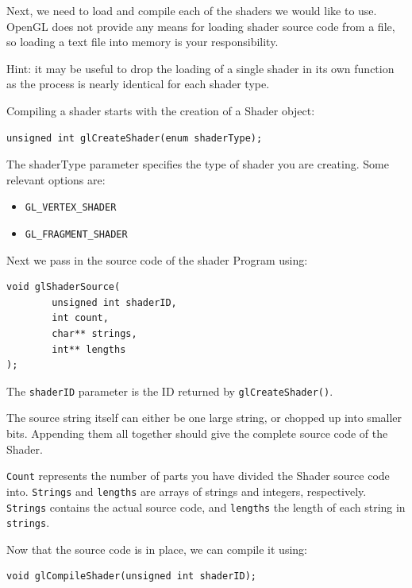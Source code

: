 Next, we need to load and compile each of the shaders we would like to use. OpenGL does not provide any means for loading shader source code from a file, so loading a text file into memory is your responsibility. 

Hint: it may be useful to drop the loading of a single shader in its own function as the process is nearly identical for each shader type.

Compiling a shader starts with the creation of a Shader object:

\begin{verbatim}
unsigned int glCreateShader(enum shaderType);
\end{verbatim}

The shaderType parameter specifies the type of shader you are creating. Some relevant options are:

\begin{itemize}
  \item \texttt{GL_VERTEX_SHADER}
  \item \texttt{GL_FRAGMENT_SHADER}
\end{itemize}

Next we pass in the source code of the shader Program using:

\begin{verbatim}
void glShaderSource(
        unsigned int shaderID, 
        int count, 
        char** strings, 
        int** lengths
);
\end{verbatim}

The \texttt{shaderID} parameter is the ID returned by \texttt{glCreateShader()}.

The source string itself can either be one large string, or chopped up into smaller bits. Appending them all together should give the complete source code of the Shader.

\texttt{Count} represents the number of parts you have divided the Shader source code into. \texttt{Strings} and \texttt{lengths} are arrays of strings and integers, respectively. \texttt{Strings} contains the actual source code, and \texttt{lengths} the length of each string in \texttt{strings}. 

Now that the source code is in place, we can compile it using:

\begin{verbatim}
void glCompileShader(unsigned int shaderID);
\end{verbatim}

